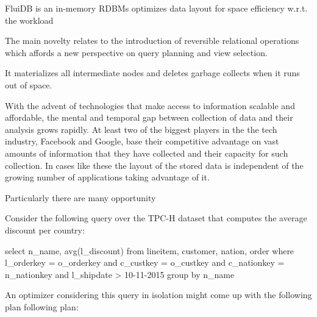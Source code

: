 \begin{summary}
\item FluiDB is an in-memory RDBMs optimizes data layout for space efficiency w.r.t. the workload
\item The main novelty relates to the introduction of reversible relational operations which affords a new
  perspective on query planning and view selection.
\item It materializes all intermediate nodes and deletes garbage collects when it runs out of space.
\end{summary}

With the advent of technologies that make access to information
scalable and affordable, the mental and temporal gap between
collection of data and their analysis grows rapidly. At least two of
the biggest players in the the tech industry, Facebook and Google,
base their competitive advantage on vast amounts of information that
they have collected and their capacity for such collection. In cases
like these the layout of the stored data is independent of the growing
number of applications taking advantage of it.

Particularly there are many opportunity

Consider the following query over the TPC-H dataset that computes the
average discount per country:

\begin{code}
  \begin{sqlcode}
    select      n_name, avg(l_discount)
    from        lineitem, customer, nation, order
    where       l_orderkey = o_orderkey
    and         c_custkey = o_custkey
    and         c_nationkey = n_nationkey
    and         l_shipdate > 10-11-2015
    group by    n_name
  \end{sqlcode}
\end{code}

An optimizer considering this query in isolation might come up with
the following plan following plan:

